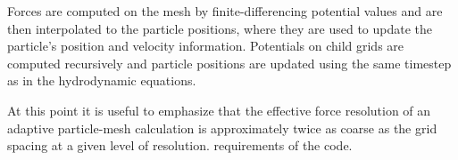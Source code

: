 Forces are computed on the mesh by finite-differencing potential values and are then interpolated to the particle positions, where they are used to update the particle's position and velocity information.  Potentials on child grids are computed recursively and particle positions are updated using the same timestep as in the hydrodynamic equations.  

At this point it is useful to emphasize that the effective force resolution of an adaptive particle-mesh calculation is approximately twice as coarse as the grid spacing at a given level of resolution.  
requirements of the code.

